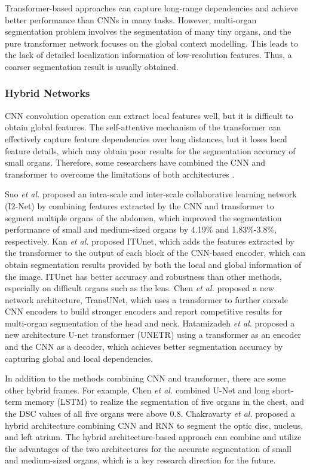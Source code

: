 \documentclass[lettersize,journal]{IEEEtran}
\begin{document}
Transformer-based approaches can capture long-range dependencies and achieve better performance than CNNs in many tasks. However, multi-organ segmentation problem involves the segmentation of many tiny organs, and the pure transformer network focuses on the global context modelling. This leads to the lack of detailed localization information of low-resolution features. Thus, a coarser segmentation result is usually obtained.

\subsubsection{Hybrid Networks}
CNN convolution operation can extract local features well, but it is difficult to obtain global features. The self-attentive mechanism of the transformer can effectively capture feature dependencies over long distances, but it loses local feature details, which may obtain poor results for the segmentation accuracy of small organs. Therefore, some researchers have combined the CNN and transformer to overcome the limitations of both architectures \cite{82,113,116,117,118,119}.

Suo {\it{et al.}} \cite{76} proposed an intra-scale and inter-scale collaborative learning network (I2-Net) by combining features extracted by the CNN and transformer to segment multiple organs of the abdomen, which improved the segmentation performance of small and medium-sized organs by 4.19\% and 1.83\%-3.8\%, respectively. Kan {\it{et al.}} \cite{51} proposed ITUnet, which adds the features extracted by the transformer to the output of each block of the CNN-based encoder, which can obtain segmentation results provided by both the local and global information of the image. ITUnet has better accuracy and robustness than other methods, especially on difficult organs such as the lens. Chen {\it{et al.}} \cite{72} proposed a new network architecture, TransUNet, which uses a transformer to further encode CNN encoders to build stronger encoders and report competitive results for multi-organ segmentation of the head and neck. Hatamizadeh {\it{et al.}} \cite{66} proposed a new architecture U-net transformer (UNETR) using a transformer as an encoder and the CNN as a decoder, which achieves better segmentation accuracy by capturing global and local dependencies.

In addition to the methods combining CNN and transformer, there are some other hybrid frames. For example, Chen {\it{et al.}} \cite{120} combined U-Net and long short-term memory (LSTM) to realize the segmentation of five organs in the chest, and the DSC values of all five organs were above 0.8. Chakravarty {\it{et al.}} \cite{121} proposed a hybrid architecture combining CNN and RNN to segment the optic disc, nucleus, and left atrium. The hybrid architecture-based approach can combine and utilize the advantages of the two architectures for the accurate segmentation of small and medium-sized organs, which is a key research direction for the future.
\end{document}
